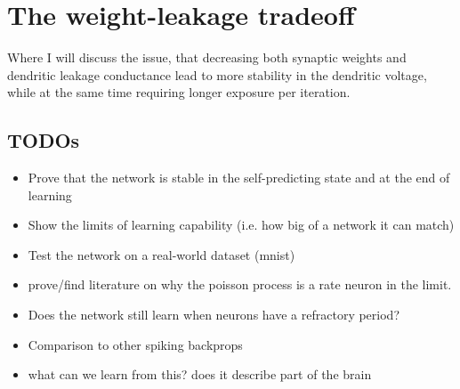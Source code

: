 \documentclass[12pt,a4paper,titlepage]{report}
\begin{document}
\chapter{The weight-leakage tradeoff}

Where I will discuss the issue, that decreasing both synaptic weights and dendritic leakage conductance
lead to more stability in the dendritic voltage, while at the same time requiring longer exposure
per iteration.


\section*{TODOs}

\begin{itemize}
  \item Prove that the network is stable in the self-predicting state and at the end of learning
  \item Show the limits of learning capability (i.e. how big of a network it can match)
  \item Test the network on a real-world dataset (mnist)
  \item prove/find literature on why the poisson process is a rate neuron in the limit.
  \item Does the network still learn when neurons have a refractory period?
  \item Comparison to other spiking backprops
  \item what can we learn from this? does it describe part of the brain
\end{itemize}

\newpage

\end{document}
